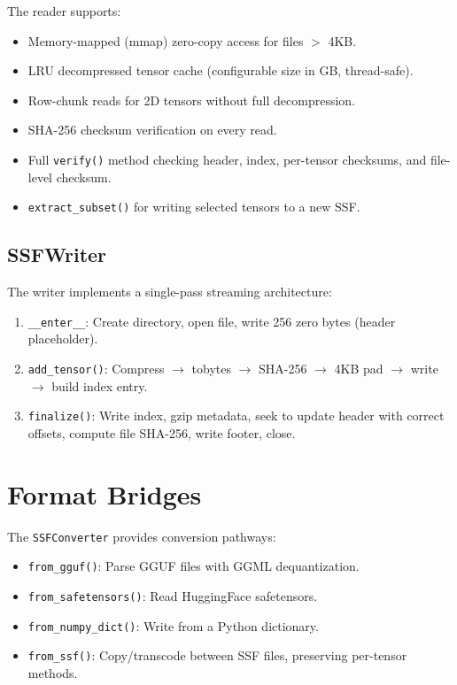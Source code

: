 \documentclass[11pt,a4paper,openright]{book}
\begin{document}
The reader supports:
\begin{itemize}
	\item Memory-mapped (mmap) zero-copy access for files $>$ 4KB.
	\item LRU decompressed tensor cache (configurable size in GB, thread-safe).
	\item Row-chunk reads for 2D tensors without full decompression.
	\item SHA-256 checksum verification on every read.
	\item Full \texttt{verify()} method checking header, index, per-tensor checksums, and file-level checksum.
	\item \texttt{extract\_subset()} for writing selected tensors to a new SSF.
\end{itemize}

\subsection{SSFWriter}

The writer implements a single-pass streaming architecture:
\begin{enumerate}
	\item \texttt{\_\_enter\_\_}: Create directory, open file, write 256 zero bytes (header placeholder).
	\item \texttt{add\_tensor()}: Compress $\to$ tobytes $\to$ SHA-256 $\to$ 4KB pad $\to$ write $\to$ build index entry.
	\item \texttt{finalize()}: Write index, gzip metadata, seek to update header with correct offsets, compute file SHA-256, write footer, close.
\end{enumerate}

\section{Format Bridges}

The \texttt{SSFConverter} provides conversion pathways:
\begin{itemize}
	\item \texttt{from\_gguf()}: Parse GGUF files with GGML dequantization.
	\item \texttt{from\_safetensors()}: Read HuggingFace safetensors.
	\item \texttt{from\_numpy\_dict()}: Write from a Python dictionary.
	\item \texttt{from\_ssf()}: Copy/transcode between SSF files, preserving per-tensor methods.
\end{itemize}
\end{document}

